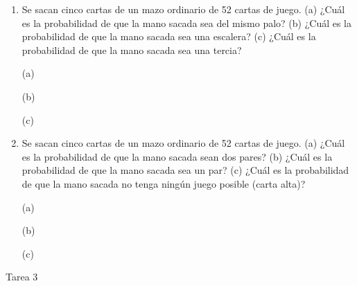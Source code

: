 \documentclass[a4paper, 12pt]{article}
\newcommand{\Pspace}{0.5cm}
\newcommand{\Aspace}{0.2cm}
\begin{document}
\begin{enumerate}
    
    \newpage
    \vspace{\Pspace}
    \item Se sacan cinco cartas de un mazo ordinario de 52 cartas de juego. (a) ¿Cuál es la probabilidad de que la mano sacada sea del mismo palo? (b) ¿Cuál es la probabilidad de que la mano sacada sea una escalera? (c) ¿Cuál es la probabilidad de que la mano sacada sea una tercia?
    \vspace{\Aspace} \par
    (a) { \color{azul}  }
    
    \vspace{\Aspace}
    (b) { \color{azul}  }
    
    \vspace{\Aspace}
    (c) { \color{azul}  }


    \vspace{\Pspace}
    \item Se sacan cinco cartas de un mazo ordinario de 52 cartas de juego. (a) ¿Cuál es la probabilidad de que la mano sacada sean dos pares? (b) ¿Cuál es la probabilidad de que la mano sacada sea un par? (c) ¿Cuál es la probabilidad de que la mano sacada no tenga ningún juego posible (carta alta)?
    \vspace{\Aspace} \par
    (a) { \color{azul}  }
    
    \vspace{\Aspace}
    (b) { \color{azul}  }
    
    \vspace{\Aspace}
    (c) { \color{azul}  }    
\end{enumerate}



\newpage
\begin{center}
    { \LARGE Tarea 3}
\end{center}
\end{document}
